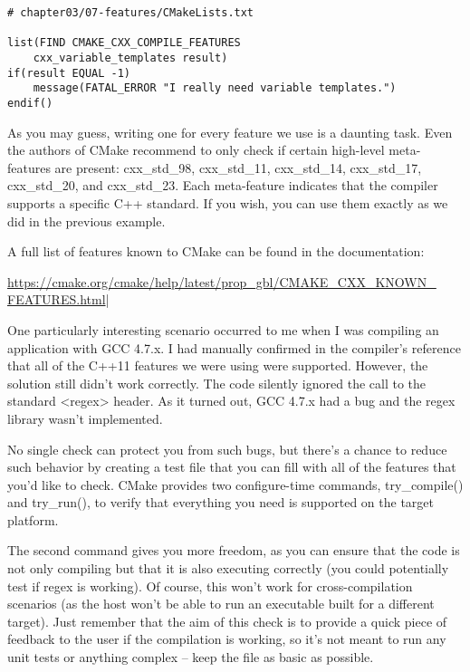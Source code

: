\begin{lstlisting}[style=styleCMake]
# chapter03/07-features/CMakeLists.txt

list(FIND CMAKE_CXX_COMPILE_FEATURES
	cxx_variable_templates result)
if(result EQUAL -1)
	message(FATAL_ERROR "I really need variable templates.")
endif()
\end{lstlisting}

As you may guess, writing one for every feature we use is a daunting task. Even the authors of CMake recommend to only check if certain high-level meta-features are present: cxx\_std\_98, cxx\_std\_11, cxx\_std\_14, cxx\_std\_17, cxx\_std\_20, and cxx\_std\_23. Each meta-feature indicates that the compiler supports a specific C++ standard. If you wish, you can use them exactly as we did in the previous example.

A full list of features known to CMake can be found in the documentation:

\url{https://cmake.org/cmake/help/latest/prop_gbl/CMAKE_CXX_KNOWN_ FEATURES.html}|


One particularly interesting scenario occurred to me when I was compiling an application with GCC 4.7.x. I had manually confirmed in the compiler's reference that all of the C++11 features we were using were supported. However, the solution still didn't work correctly. The code silently ignored the call to the standard <regex> header. As it turned out, GCC 4.7.x had a bug and the regex library wasn't implemented.

No single check can protect you from such bugs, but there's a chance to reduce such behavior by creating a test file that you can fill with all of the features that you'd like to check. CMake provides two configure-time commands, try\_compile() and try\_run(), to verify that everything you need is supported on the target platform.

The second command gives you more freedom, as you can ensure that the code is not only compiling but that it is also executing correctly (you could potentially test if regex is working). Of course, this won't work for cross-compilation scenarios (as the host won't be able to run an executable built for a different target). Just remember that the aim of this check is to provide a quick piece of feedback to the user if the compilation is working, so it's not meant to run any unit tests or anything complex – keep the file as basic as possible.

